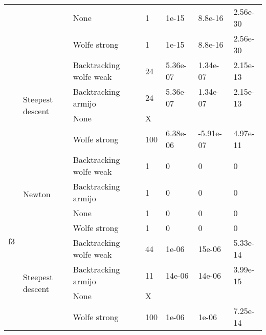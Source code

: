 \documentclass[a4paper,11pt]{article}
\numberwithin{equation}{section} %
\begin{document}
\begin{table}[h!]
\begin{tabular}{|c|l|l|l|l|l|l|}
                                &                                   & None                    & 1          & 1e-15    & 8.8e-16   & 2.56e-30     \\ \cline{3-7}
                                &                                   & Wolfe strong            & 1          & 1e-15    & 8.8e-16   & 2.56e-30     \\ \cline{2-7}
                                & \multirow{4}{*}{Steepest descent} & Backtracking wolfe weak & 24         & 5.36e-07 & 1.34e-07  & 2.15e-13     \\ \cline{3-7}
                                &                                   & Backtracking armijo     & 24         & 5.36e-07 & 1.34e-07  & 2.15e-13     \\ \cline{3-7}
                                &                                   & None                    & X          &          &           &              \\ \cline{3-7}
                                &                                   & Wolfe strong            & 100        & 6.38e-06 & -5.91e-07 & 4.97e-11     \\ \hline
\multirow{8}{*}{f3}             & \multirow{4}{*}{Newton}           & Backtracking wolfe weak & 1          & 0        & 0         & 0            \\ \cline{3-7}
                                &                                   & Backtracking armijo     & 1          & 0        & 0         & 0            \\ \cline{3-7}
                                &                                   & None                    & 1          & 0        & 0         & 0            \\ \cline{3-7}
                                &                                   & Wolfe strong            & 1          & 0        & 0         & 0            \\ \cline{2-7}
                                & \multirow{4}{*}{Steepest descent} & Backtracking wolfe weak & 44         & 1e-06    & 15e-06    & 5.33e-14     \\ \cline{3-7}
                                &                                   & Backtracking armijo     & 11         & 14e-06   & 14e-06    & 3.99e-15     \\ \cline{3-7}
                                &                                   & None                    & X          &          &           &              \\ \cline{3-7}
                                &                                   & Wolfe strong            & 100        & 1e-06    & 1e-06     & 7.25e-14     \\ \hline

\end{tabular}
\end{table}
\end{document}
